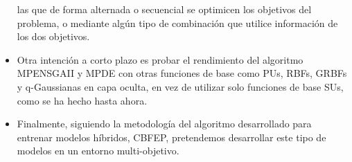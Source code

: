 \begin{itemize}
			las que de forma alternada o secuencial se optimicen los objetivos del problema, o
			mediante algún tipo de combinación que utilice información de los dos objetivos.
	 \item Otra intención a corto plazo es probar el rendimiento del algoritmo MPENSGAII y MPDE con
			otras funciones de base como PUs, RBFs, GRBFs y q-Gaussianas en capa oculta, en
vez de utilizar solo funciones de base SUs,
			como se ha hecho hasta	ahora.
	 \item Finalmente, siguiendo la metodología del algoritmo desarrollado para entrenar
modelos
			híbridos, CBFEP, pretendemos desarrollar este tipo de modelos en un entorno
multi-objetivo.
\end{itemize}
\paginavaciacompleta